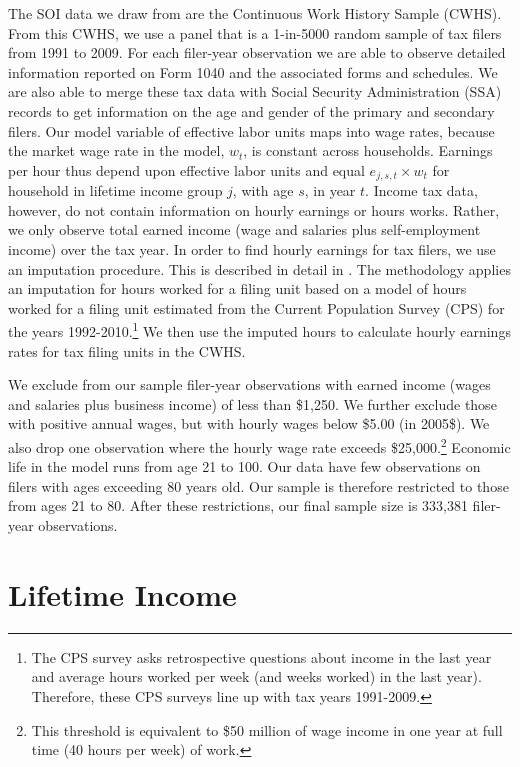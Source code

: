   The SOI data we draw from are the Continuous Work History Sample (CWHS).  From this CWHS, we use a panel that is a 1-in-5000 random sample of tax filers from 1991 to 2009.  For each filer-year observation we are able to observe detailed information reported on Form 1040 and the associated forms and schedules.  We are also able to merge these tax data with Social Security Administration (SSA) records to get information on the age and gender of the primary and secondary filers.  Our model variable of effective labor units maps into wage rates, because the market wage rate in the model, $w_{t}$, is constant across households.  Earnings per hour thus depend upon effective labor units and equal $e_{j,s,t}\times w_{t}$ for household in lifetime income group $j$, with age $s$, in year $t$.  Income tax data, however, do not contain information on hourly earnings or hours works.  Rather, we only observe total earned income (wage and salaries plus self-employment income) over the tax year.  In order to find hourly earnings for tax filers, we use an imputation procedure.  This is described in detail in \citet{DeBackerRamnath:2017}.  The methodology applies an imputation for hours worked for a filing unit based on a model of hours worked for a filing unit estimated from the Current Population Survey (CPS) for the years 1992-2010.\footnote{The CPS survey asks retrospective questions about income in the last year and average hours worked per week (and weeks worked) in the last year).  Therefore, these CPS surveys line up with tax years 1991-2009.} We then use the imputed hours to calculate hourly earnings rates for tax filing units in the CWHS.

  We exclude from our sample filer-year observations with earned income (wages and salaries plus business income) of less than \$1,250. We further exclude those with positive annual wages, but with hourly wages below \$5.00 (in 2005\$). We also drop one observation where the hourly wage rate exceeds \$25,000.\footnote{This threshold is equivalent to \$50 million of wage income in one year at full time (40 hours per week) of work.} Economic life in the model runs from age 21 to 100. Our data have few observations on filers with ages exceeding 80 years old. Our sample is therefore restricted to those from ages 21 to 80. After these restrictions, our final sample size is 333,381 filer-year observations.


\section{Lifetime Income}\label{SecLFearnLifInc}

